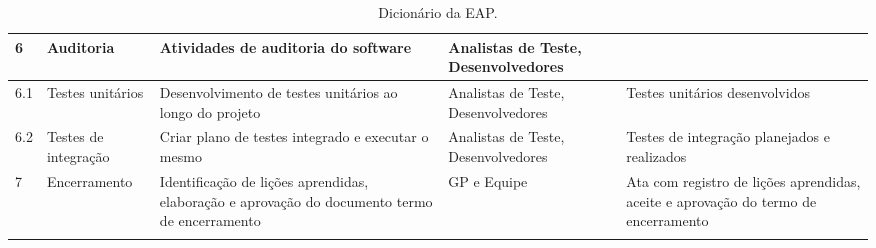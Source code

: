 \begin{longtable}{  l  p{}  p{}  p{}  p{}  }
	\midrule
	6           & Auditoria                                                 & Atividades de auditoria do software                                                                                                                                              & Analistas de Teste, Desenvolvedores                                                              &                                                                                                          \\*
	\midrule
	6.1         & Testes unitários                                         & Desenvolvimento de testes unitários ao longo do projeto                                                                                                                         & Analistas de Teste, Desenvolvedores                                                              & Testes unitários desenvolvidos                                                                          \\*
	\midrule
	6.2         & Testes de integração                                    & Criar plano de testes integrado e executar o mesmo                                                                                                                               & Analistas de Teste, Desenvolvedores                                                              & Testes de integração planejados e realizados                                                           \\*
	\midrule
	7           & Encerramento                                              & Identificação de lições aprendidas, elaboração e aprovação do documento termo de encerramento                                                                            & GP e Equipe                                                                                      & Ata com registro de lições aprendidas, aceite e aprovação do termo de encerramento                   \\*
	\bottomrule
	\caption{Dicionário da EAP.}
	\centering
\end{longtable}
